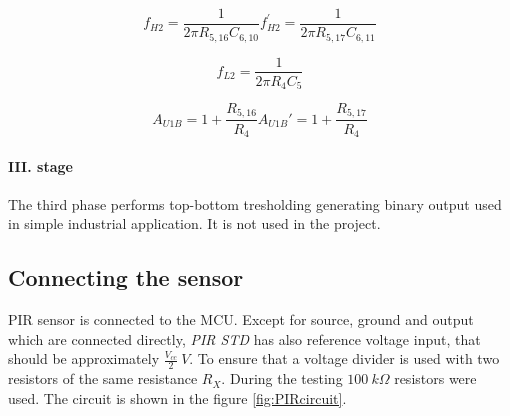 \begin{subequations}
\begin{equation}
f_{H2} = \frac{1}{2 \pi R_{5,16} C_{6,10}}
\end{equation}

\begin{equation}
f_{H2}^{'} = \frac{1}{2 \pi R_{5,17} C_{6,11}}
\end{equation}
\end{subequations}

\begin{equation}
f_{L2} = \frac{1}{2 \pi R_4 C_5}
\end{equation}

\begin{subequations}
\begin{equation}
A_{U1B} = 1 + \frac{R_{5,16}}{R_4}
\end{equation}
\begin{equation}
A_{U1B}' = 1 + \frac{R_{5,17}}{R_4}
\end{equation}
\end{subequations}

\paragraph{III. stage}
The third phase performs top-bottom tresholding generating binary output
used in simple industrial application. It is not used in the project.\cite{PIRSchemeDescription}


\subsection*{Connecting the sensor}
PIR sensor is connected to the MCU. Except for source, ground and output which are connected directly,
{\it PIR STD} has also reference voltage input, that should be approximately $\frac{V_{cc}}{2}~V$.
To ensure that a voltage divider is used with two resistors of the same resistance $R_X$.
During the testing $100~k\Omega$ resistors were used. The circuit is shown in the figure \ref{fig:PIRcircuit}.

